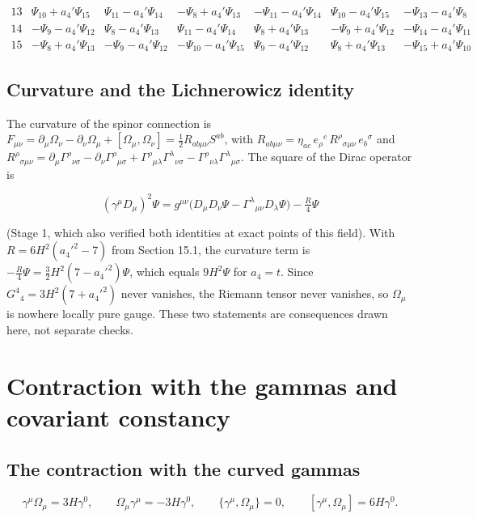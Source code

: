 \documentclass[11pt]{article}
\begin{document}
\[\begin{array}{c|cccccc}
13 & \Psi_{10}+a_4'\Psi_{15} & \Psi_{11}-a_4'\Psi_{14} & -\Psi_{8}+a_4'\Psi_{13} & -\Psi_{11}-a_4'\Psi_{14} & \Psi_{10}-a_4'\Psi_{15} & -\Psi_{13}-a_4'\Psi_{8} \\
14 & -\Psi_{9}-a_4'\Psi_{12} & \Psi_{8}-a_4'\Psi_{13} & \Psi_{11}-a_4'\Psi_{14} & \Psi_{8}+a_4'\Psi_{13} & -\Psi_{9}+a_4'\Psi_{12} & -\Psi_{14}-a_4'\Psi_{11} \\
15 & -\Psi_{8}+a_4'\Psi_{13} & -\Psi_{9}-a_4'\Psi_{12} & -\Psi_{10}-a_4'\Psi_{15} & \Psi_{9}-a_4'\Psi_{12} & \Psi_{8}+a_4'\Psi_{13} & -\Psi_{15}+a_4'\Psi_{10}
\end{array}
\]

\subsection{Curvature and the Lichnerowicz identity}

The curvature of the spinor connection is $F_{\mu\nu}=\partial_\mu\Omega_\nu-\partial_\nu\Omega_\mu+[\Omega_\mu,\Omega_\nu]=\tfrac12R_{ab\mu\nu}S^{ab}$, with $R_{ab\mu\nu}=\eta_{ac}\,e_\rho{}^c\,R^\rho{}_{\sigma\mu\nu}\,e_b{}^\sigma$ and $R^\rho{}_{\sigma\mu\nu}=\partial_\mu\Gamma^\rho{}_{\nu\sigma}-\partial_\nu\Gamma^\rho{}_{\mu\sigma}+\Gamma^\rho{}_{\mu\lambda}\Gamma^\lambda{}_{\nu\sigma}-\Gamma^\rho{}_{\nu\lambda}\Gamma^\lambda{}_{\mu\sigma}$. The square of the Dirac operator is

\[
(\gamma^\mu D_\mu)^2\Psi=g^{\mu\nu}\bigl(D_\mu D_\nu\Psi-\Gamma^\lambda{}_{\mu\nu}D_\lambda\Psi\bigr)-\tfrac{R}{4}\Psi
\]

(Stage 1, which also verified both identities at exact points of this field). With $R=6H^2(a_4'^2-7)$ from Section 15.1, the curvature term is $-\tfrac R4\Psi=\tfrac32H^2(7-a_4'^2)\Psi$, which equals $9H^2\Psi$ for $a_4=t$. Since $G^4{}_4=3H^2(7+a_4'^2)$ never vanishes, the Riemann tensor never vanishes, so $\Omega_\mu$ is nowhere locally pure gauge. These two statements are consequences drawn here, not separate checks.

\section{Contraction with the gammas and covariant constancy}

\subsection{The contraction with the curved gammas}

\[
\gamma^\mu\Omega_\mu=3H\gamma^0,\qquad \Omega_\mu\gamma^\mu=-3H\gamma^0,\qquad \{\gamma^\mu,\Omega_\mu\}=0,\qquad [\gamma^\mu,\Omega_\mu]=6H\gamma^0 .
\]
\end{document}
